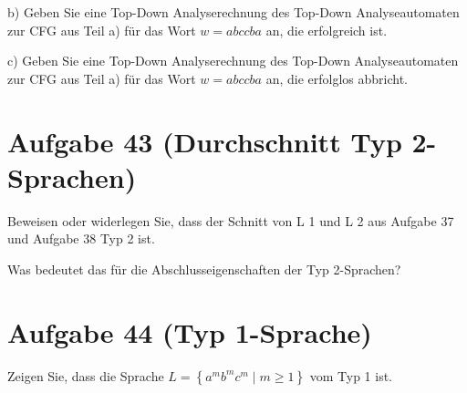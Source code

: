 \documentclass{article}
\begin{document}
b) Geben Sie eine Top-Down Analyserechnung des Top-Down Analyseautomaten zur CFG aus Teil a) für das Wort $w=abccba$ an, die erfolgreich ist.

c) Geben Sie eine Top-Down Analyserechnung des Top-Down Analyseautomaten zur CFG aus Teil a) für das Wort $w=abccba$ an, die erfolglos abbricht.


\section*{Aufgabe 43 (Durchschnitt Typ 2-Sprachen)}

Beweisen oder widerlegen Sie, dass der Schnitt von L 1 und L 2 aus Aufgabe 37 und Aufgabe 38 Typ 2 ist.


Was bedeutet das für die Abschlusseigenschaften der Typ 2-Sprachen?


\section*{Aufgabe 44 (Typ 1-Sprache)}

Zeigen Sie, dass die Sprache $L = \left\{a^m b^m c^m \mid m \geq 1\right\}$ vom Typ 1 ist.
\end{document}
